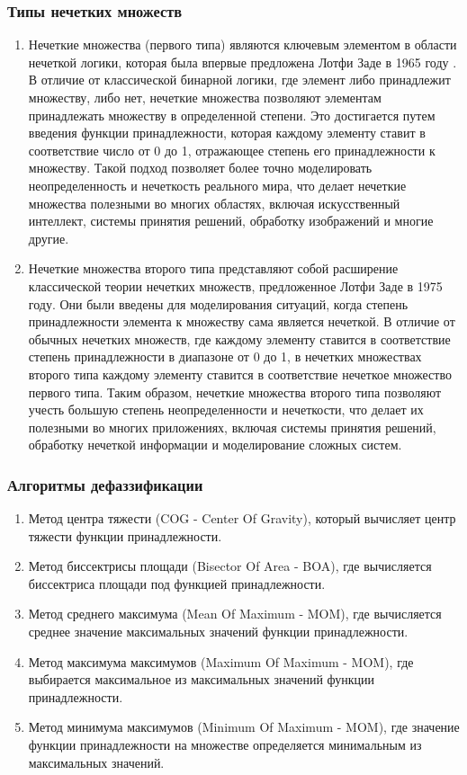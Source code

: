 \documentclass{article}
\begin{document}
    \subsubsection{Типы нечетких множеств}
    \begin{enumerate}
        \item Нечеткие множества (первого типа) являются ключевым элементом в области нечеткой логики, которая была впервые предложена Лотфи Заде в 1965 году \cite{litlink20}. В отличие от классической бинарной логики, где элемент либо принадлежит множеству, либо нет, нечеткие множества позволяют элементам принадлежать множеству в определенной степени. Это достигается путем введения функции принадлежности, которая каждому элементу ставит в соответствие число от 0 до 1, отражающее степень его принадлежности к множеству. Такой подход позволяет более точно моделировать неопределенность и нечеткость реального мира, что делает нечеткие множества полезными во многих областях, включая искусственный интеллект, системы принятия решений, обработку изображений и многие другие.
        \item Нечеткие множества второго типа представляют собой расширение классической теории нечетких множеств, предложенное Лотфи Заде в 1975 году. Они были введены для моделирования ситуаций, когда степень принадлежности элемента к множеству сама является нечеткой. В отличие от обычных нечетких множеств, где каждому элементу ставится в соответствие степень принадлежности в диапазоне от 0 до 1, в нечетких множествах второго типа каждому элементу ставится в соответствие нечеткое множество первого типа. Таким образом, нечеткие множества второго типа позволяют учесть большую степень неопределенности и нечеткости, что делает их полезными во многих приложениях, включая системы принятия решений, обработку нечеткой информации и моделирование сложных систем.
    \end{enumerate}
    \subsubsection{Алгоритмы дефаззификации}
    \begin{enumerate}
        \item Метод центра тяжести (COG - Center Of Gravity), который вычисляет центр тяжести функции принадлежности.
        \item Метод биссектрисы площади (Bisector Of Area - BOA), где вычисляется биссектриса площади под функцией принадлежности.
        \item Метод среднего максимума (Mean Of Maximum - MOM), где вычисляется среднее значение максимальных значений функции принадлежности.
        \item Метод максимума максимумов (Maximum Of Maximum - MOM), где выбирается максимальное из максимальных значений функции принадлежности.
        \item Метод минимума максимумов (Minimum Of Maximum - MOM), где значение функции принадлежности на множестве определяется минимальным из максимальных значений.
    \end{enumerate}
\end{document}
